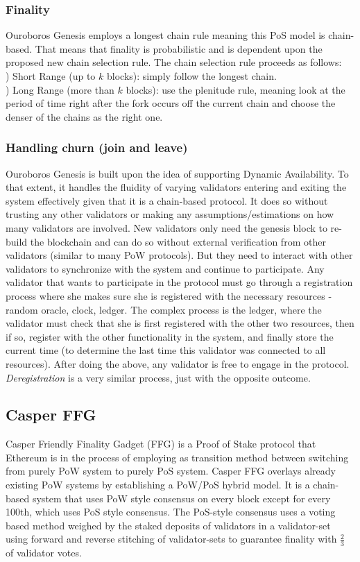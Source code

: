 \documentclass[10pt,journal,compsoc]{IEEEtran}
\begin{document}
\subsubsection{Finality}
Ouroboros Genesis employs a longest chain rule meaning this PoS model is chain-based. That means that finality is probabilistic and is dependent upon the proposed new chain selection rule. The chain selection rule proceeds as follows: 
\\
) Short Range (up to $k$ blocks): simply follow the longest \indent chain.
\\
) Long Range (more than $k$ blocks): use the plenitude \indent rule, meaning look at the period of time right after the \indent fork occurs off the current chain and choose the denser \indent of the chains as the right one.

\subsubsection{Handling churn (join and leave)}
Ouroboros Genesis is built upon the idea of supporting Dynamic Availability. To that extent, it handles the fluidity of varying validators entering and exiting the system effectively given that it is a chain-based protocol. It does so without trusting any other validators or making any assumptions/estimations on how many validators are involved. New validators only need the genesis block to re-build the blockchain and can do so without external verification from other validators (similar to many PoW protocols). But they need to interact with other validators to synchronize with the system and continue to participate. Any validator that wants to participate in the protocol must go through a registration process where she makes sure she is registered with the necessary resources - random oracle, clock, ledger. The complex process is the ledger, where the validator must check that she is first registered with the other two resources, then if so, register with the other functionality in the system, and finally store the current time (to determine the last time this validator was connected to all resources). After doing the above, any validator is free to engage in the protocol. \emph{Deregistration} is a very similar process, just with the opposite outcome.

\subsection{Casper FFG}
Casper Friendly Finality Gadget (FFG) \cite{FFG} is a Proof of Stake protocol that Ethereum is in the process of employing as transition method between switching from purely PoW system to purely PoS system. Casper FFG overlays already existing PoW systems by establishing a PoW/PoS hybrid model. It is a chain-based system that uses PoW style consensus on every block except for every 100th, which uses PoS style consensus. The PoS-style consensus uses a voting based method weighed by the staked deposits of validators in a validator-set using forward and reverse stitching of validator-sets to guarantee finality with \(\frac{2}{3}\) of validator votes.
\end{document}
